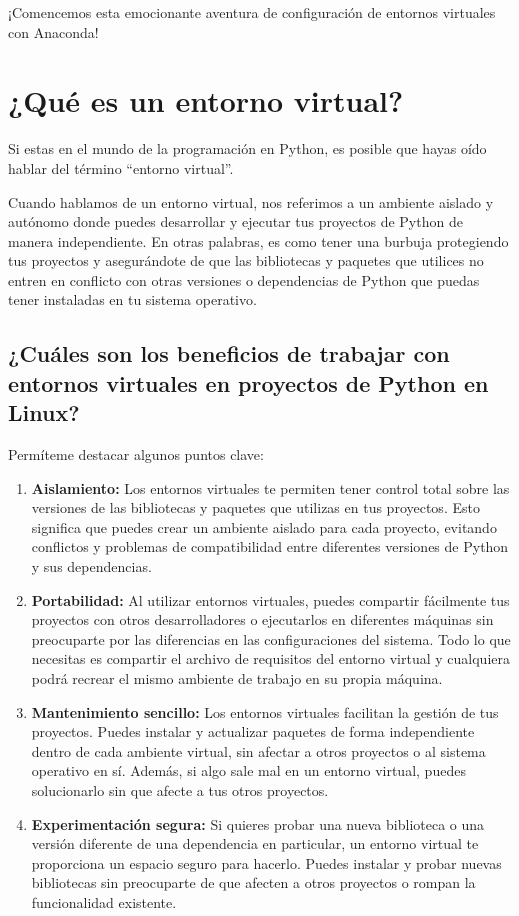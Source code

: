 \documentclass[
  jou,
  floatsintext,
  longtable,
  a4paper,
  nolmodern,
  notxfonts,
  notimes,
  colorlinks=true,linkcolor=blue,citecolor=blue,urlcolor=blue]{apa7}
\begin{document}
¡Comencemos esta emocionante aventura de configuración de entornos
virtuales con Anaconda!

\section{¿Qué es un entorno
virtual?}\label{quuxe9-es-un-entorno-virtual}

Si estas en el mundo de la programación en Python, es posible que hayas
oído hablar del término ``entorno virtual''.

Cuando hablamos de un entorno virtual, nos referimos a un ambiente
aislado y autónomo donde puedes desarrollar y ejecutar tus proyectos de
Python de manera independiente. En otras palabras, es como tener una
burbuja protegiendo tus proyectos y asegurándote de que las bibliotecas
y paquetes que utilices no entren en conflicto con otras versiones o
dependencias de Python que puedas tener instaladas en tu sistema
operativo.

\subsection{¿Cuáles son los beneficios de trabajar con entornos
virtuales en proyectos de Python en
Linux?}\label{cuuxe1les-son-los-beneficios-de-trabajar-con-entornos-virtuales-en-proyectos-de-python-en-linux}

Permíteme destacar algunos puntos clave:

\begin{enumerate}
\def\labelenumi{\arabic{enumi}.}
\item
  \textbf{Aislamiento:} Los entornos virtuales te permiten tener control
  total sobre las versiones de las bibliotecas y paquetes que utilizas
  en tus proyectos. Esto significa que puedes crear un ambiente aislado
  para cada proyecto, evitando conflictos y problemas de compatibilidad
  entre diferentes versiones de Python y sus dependencias.
\item
  \textbf{Portabilidad:} Al utilizar entornos virtuales, puedes
  compartir fácilmente tus proyectos con otros desarrolladores o
  ejecutarlos en diferentes máquinas sin preocuparte por las diferencias
  en las configuraciones del sistema. Todo lo que necesitas es compartir
  el archivo de requisitos del entorno virtual y cualquiera podrá
  recrear el mismo ambiente de trabajo en su propia máquina.
\item
  \textbf{Mantenimiento sencillo:} Los entornos virtuales facilitan la
  gestión de tus proyectos. Puedes instalar y actualizar paquetes de
  forma independiente dentro de cada ambiente virtual, sin afectar a
  otros proyectos o al sistema operativo en sí. Además, si algo sale mal
  en un entorno virtual, puedes solucionarlo sin que afecte a tus otros
  proyectos.
\item
  \textbf{Experimentación segura:} Si quieres probar una nueva
  biblioteca o una versión diferente de una dependencia en particular,
  un entorno virtual te proporciona un espacio seguro para hacerlo.
  Puedes instalar y probar nuevas bibliotecas sin preocuparte de que
  afecten a otros proyectos o rompan la funcionalidad existente.
\end{enumerate}
\end{document}
